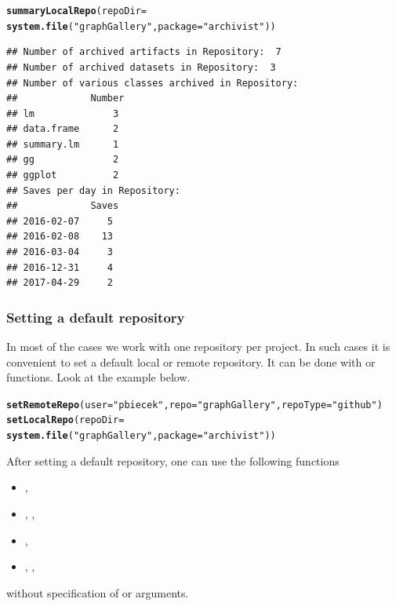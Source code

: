 \documentclass[nojss]{jss}\usepackage[]{graphicx}\usepackage[]{color}
\makeatletter
\newcommand{\hlstr}[1]{\textcolor[rgb]{0.192,0.494,0.8}{#1}}%
\newcommand{\hlstd}[1]{\textcolor[rgb]{0.345,0.345,0.345}{#1}}%
\newcommand{\hlkwc}[1]{\textcolor[rgb]{0.333,0.667,0.333}{#1}}%
\newcommand{\hlkwd}[1]{\textcolor[rgb]{0.737,0.353,0.396}{\textbf{#1}}}%
\newenvironment{kframe}{%
 \def\at@end@of@kframe{}%
 \ifinner\ifhmode%
  \def\at@end@of@kframe{\end{minipage}}%
  \begin{minipage}{\columnwidth}%
 \fi\fi%
 \def\FrameCommand##1{\hskip\@totalleftmargin \hskip-\fboxsep
 \colorbox{shadecolor}{##1}\hskip-\fboxsep
     \hskip-\linewidth \hskip-\@totalleftmargin \hskip\columnwidth}%
 \MakeFramed {\advance\hsize-\width
   \@totalleftmargin\z@ \linewidth\hsize
   \@setminipage}}%
 {\par\unskip\endMakeFramed%
 \at@end@of@kframe}
\newenvironment{knitrout}{}{} %
\makeatother
\begin{document}
\begin{knitrout}
\color{fgcolor}\begin{kframe}
\begin{alltt}
\hlkwd{summaryLocalRepo}\hlstd{(}\hlkwc{repoDir} \hlstd{=}
    \hlkwd{system.file}\hlstd{(}\hlstr{"graphGallery"}\hlstd{,} \hlkwc{package} \hlstd{=} \hlstr{"archivist"}\hlstd{))}
\end{alltt}
\begin{verbatim}
## Number of archived artifacts in Repository:  7 
## Number of archived datasets in Repository:  3 
## Number of various classes archived in Repository: 
##             Number
## lm              3
## data.frame      2
## summary.lm      1
## gg              2
## ggplot          2
## Saves per day in Repository: 
##             Saves
## 2016-02-07     5
## 2016-02-08    13
## 2016-03-04     3
## 2016-12-31     4
## 2017-04-29     2
\end{verbatim}
\end{kframe}
\end{knitrout}


\subsubsection{Setting a default repository}

In most of the cases we work with one repository per project. In such cases it is convenient to set a default local or remote repository. It can be done with  or  functions. Look at the example below.

\begin{knitrout}
\color{fgcolor}\begin{kframe}
\begin{alltt}
\hlkwd{setRemoteRepo}\hlstd{(}\hlkwc{user} \hlstd{=} \hlstr{"pbiecek"}\hlstd{,} \hlkwc{repo} \hlstd{=} \hlstr{"graphGallery"}\hlstd{,} \hlkwc{repoType} \hlstd{=} \hlstr{"github"}\hlstd{)}
\hlkwd{setLocalRepo}\hlstd{(}\hlkwc{repoDir} \hlstd{=}
    \hlkwd{system.file}\hlstd{(}\hlstr{"graphGallery"}\hlstd{,} \hlkwc{package} \hlstd{=} \hlstr{"archivist"}\hlstd{))}
\end{alltt}
\end{kframe}
\end{knitrout}


After setting a default repository, one can use the following functions
\begin{itemize}
\item {},
\item {}, , 
\item {}, 
\item {}, , 
\end{itemize}
without specification of  or  arguments. 
\end{document}

